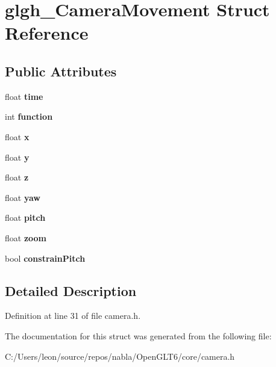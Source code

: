 \hypertarget{structglgh___camera_movement}{}\section{glgh\+\_\+\+Camera\+Movement Struct Reference}
\label{structglgh___camera_movement}
\subsection*{Public Attributes}
\begin{DoxyCompactItemize}
\item 
\mbox{\label{structglgh___camera_movement_a6c1d84f5d535389c4e75f4b592845142}} 
float {\bfseries time}
\item 
\mbox{\label{structglgh___camera_movement_a1847eecee8c9f2629b5440f12d4eae34}} 
int {\bfseries function}
\item 
\mbox{\label{structglgh___camera_movement_a73fd2612b9050579ed235350df960f48}} 
float {\bfseries x}
\item 
\mbox{\label{structglgh___camera_movement_a2d97ef652ed9c1d76738c88ba65dbca3}} 
float {\bfseries y}
\item 
\mbox{\label{structglgh___camera_movement_a357d49674214c362412c9154d16000a5}} 
float {\bfseries z}
\item 
\mbox{\label{structglgh___camera_movement_ac4534620f91e6a552487e7e092ae7bbb}} 
float {\bfseries yaw}
\item 
\mbox{\label{structglgh___camera_movement_a78db75e1b5558909e2f1638800752d44}} 
float {\bfseries pitch}
\item 
\mbox{\label{structglgh___camera_movement_abe51be3db41d0c53f96fbd4372cdb33d}} 
float {\bfseries zoom}
\item 
\mbox{\label{structglgh___camera_movement_ae1c3539eccbcd019e3d176e9219f8ab3}} 
bool {\bfseries constrain\+Pitch}
\end{DoxyCompactItemize}


\subsection{Detailed Description}


Definition at line 31 of file camera.\+h.



The documentation for this struct was generated from the following file\+:\begin{DoxyCompactItemize}
\item 
C\+:/\+Users/leon/source/repos/nabla/\+Open\+G\+L\+T6/core/camera.\+h\end{DoxyCompactItemize}

